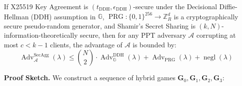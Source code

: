 \begin{theorem}
\label{thm:secagg_privacy}
If X25519 Key Agreement is $(t_{\text{DDH}}, \epsilon_{\text{DDH}})$-secure under the Decisional Diffie-Hellman (DDH) assumption in $\mathbb{G}$, $\operatorname{PRG}: \{0,1\}^{256} \to \mathbb{Z}_R^d$ is a cryptographically secure pseudo-random generator, and Shamir's Secret Sharing is $(k, N)$-information-theoretically secure, then for any PPT adversary $\mathcal{A}$ corrupting at most $c < k - 1$ clients, the advantage of $\mathcal{A}$ is bounded by:
\begin{equation}
    \operatorname{Adv}_{\mathcal{A}}^{\text{SecAgg}}(\lambda) \le \binom{N}{2} \cdot \operatorname{Adv}_{\mathbb{G}}^{\text{DDH}}(\lambda) + \operatorname{Adv}_{\operatorname{PRG}}(\lambda) + \operatorname{negl}(\lambda)
\end{equation}
\end{theorem}

\noindent\textbf{Proof Sketch.} We construct a sequence of hybrid games $\mathbf{G}_0, \mathbf{G}_1, \mathbf{G}_2, \mathbf{G}_3$:

